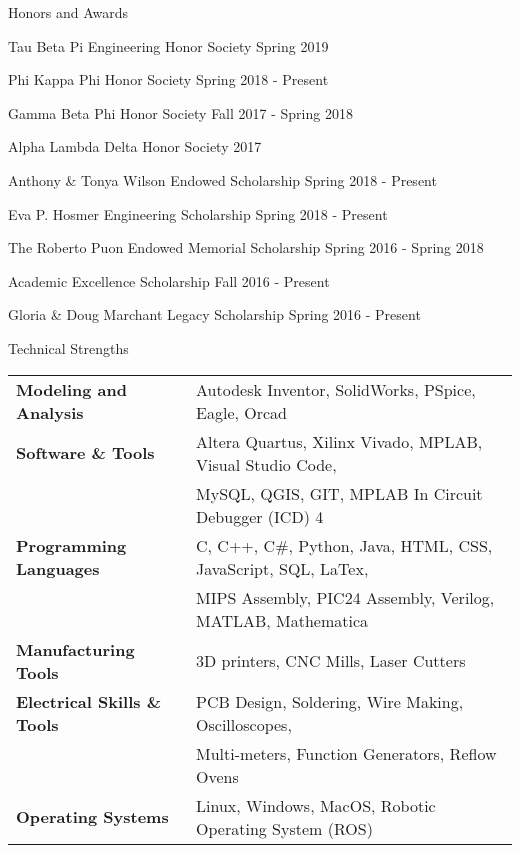 \documentclass{resume} %
\begin{document}
\begin{rSection}{Honors and Awards} 
\item Tau Beta Pi Engineering Honor Society \hfill Spring 2019
\item Phi Kappa Phi Honor Society \hfill        Spring 2018 - Present
\item Gamma Beta Phi Honor Society \hfill       Fall 2017 - Spring 2018
\item Alpha Lambda Delta Honor Society \hfill   2017
\item Anthony \& Tonya Wilson Endowed Scholarship \hfill Spring 2018 - Present
\item Eva P. Hosmer Engineering Scholarship \hfill Spring 2018 - Present
\item The Roberto Puon Endowed Memorial Scholarship \hfill Spring 2016 - Spring 2018
\item Academic Excellence Scholarship \hfill Fall 2016 - Present
\item Gloria \& Doug Marchant Legacy Scholarship \hfill Spring 2016 - Present
\end{rSection}


\begin{rSection}{Technical Strengths}

\begin{tabular}{ @{} >{\bfseries}l @{\hspace{6ex}} l }
Modeling and Analysis \ & Autodesk Inventor, SolidWorks, PSpice, Eagle, Orcad \\
Software \& Tools & Altera Quartus, Xilinx Vivado, MPLAB, Visual Studio Code,\\
                    &  MySQL, QGIS, GIT, MPLAB In Circuit Debugger (ICD) 4 \\
Programming Languages & C, C\+++, C\#, Python, Java, HTML, CSS, JavaScript, SQL, LaTex, \\
                        & MIPS Assembly, PIC24 Assembly, Verilog, MATLAB, Mathematica\\
Manufacturing Tools & 3D printers, CNC Mills, Laser Cutters \\
Electrical Skills \& Tools & PCB Design, Soldering, Wire Making, Oscilloscopes,  \\
                & Multi-meters, Function Generators, Reflow Ovens \\
Operating Systems & Linux, Windows, MacOS, Robotic Operating System (ROS) \\
\end{tabular}



\end{rSection}
\end{document}
